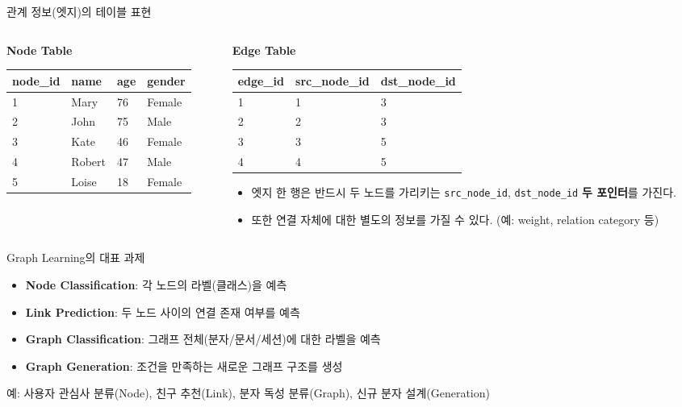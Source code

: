 \begin{frame}{관계 정보(엣지)의 테이블 표현}
\begin{columns}[T,onlytextwidth]
\begin{column}{0.49\textwidth}
\textbf{Node Table}
\vspace{0.2em}
\small
\begin{tabular}{llll}
\toprule
node\_id & name & age & gender \\
\midrule
1 & Mary & 76 & Female \\
2 & John & 75 & Male \\
3 & Kate & 46 & Female \\
4 & Robert & 47 & Male \\
5 & Loise & 18 & Female \\
\bottomrule
\end{tabular}
\end{column}
\begin{column}{0.49\textwidth}
\textbf{Edge Table}
\vspace{0.2em}
\small
\begin{tabular}{lll}
\toprule
edge\_id & src\_node\_id & dst\_node\_id \\
\midrule
1 & 1 & 3 \\
2 & 2 & 3 \\
3 & 3 & 5 \\
4 & 4 & 5 \\
\bottomrule
\end{tabular}
\vspace{0.35em}
\scriptsize
\begin{itemize}
  \item 엣지 한 행은 반드시 두 노드를 가리키는
  \texttt{src\_node\_id}, \texttt{dst\_node\_id} \textbf{두 포인터}를 가진다.
  \item 또한 연결 자체에 대한 별도의 정보를 가질 수 있다. (예: weight, relation category 등)
\end{itemize}
\end{column}
\end{columns}
\end{frame}

\begin{frame}{Graph Learning의 대표 과제}
\small
\begin{itemize}
  \item \textbf{Node Classification}: 각 노드의 라벨(클래스)을 예측
  \item \textbf{Link Prediction}: 두 노드 사이의 연결 존재 여부를 예측
  \item \textbf{Graph Classification}: 그래프 전체(분자/문서/세션)에 대한 라벨을 예측
  \item \textbf{Graph Generation}: 조건을 만족하는 새로운 그래프 구조를 생성
\end{itemize}
\vspace{0.3em}
\footnotesize
예: 사용자 관심사 분류(Node), 친구 추천(Link), 분자 독성 분류(Graph), 신규 분자 설계(Generation)
\end{frame}

